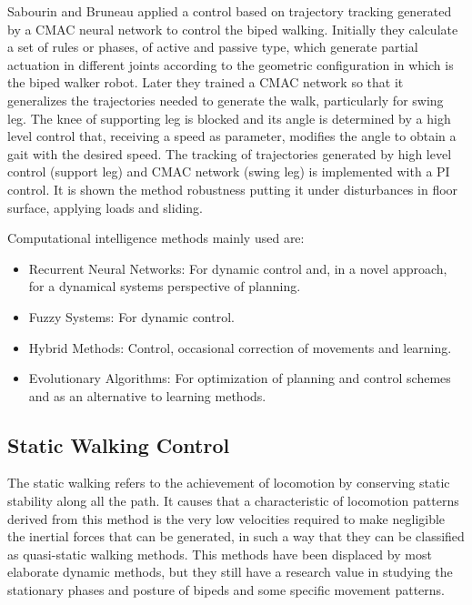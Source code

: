 Sabourin and Bruneau \cite{Sabourin05Robustness} applied a control
based on trajectory tracking generated by a CMAC neural network to
control the biped walking. Initially they calculate a set of rules or
phases, of active and passive type, which generate partial actuation
in different joints according to the geometric configuration in which
is the biped walker robot. Later they trained a CMAC network so that
it generalizes the trajectories needed to generate the walk,
particularly for swing leg. The knee of supporting leg is blocked and
its angle is determined by a high level control that, receiving a
speed as parameter, modifies the angle to obtain a gait with the
desired speed. The tracking of trajectories generated by high level
control (support leg) and CMAC network (swing leg) is implemented with
a PI control. It is shown the method robustness putting it under
disturbances in floor surface, applying loads and sliding.

Computational intelligence methods mainly used are:
\begin{itemize}
\item Recurrent Neural Networks: For dynamic control and, in a novel
  approach, for a dynamical systems perspective of planning.
\item Fuzzy Systems: For dynamic control.
\item Hybrid Methods: Control, occasional correction of movements and
  learning.
\item Evolutionary Algorithms: For optimization of planning and
  control schemes and as an alternative to learning methods.
\end{itemize}

\subsection{Static Walking Control}
The static walking refers to the achievement of locomotion by
conserving static stability along all the path. It causes that a
characteristic of locomotion patterns derived from this method is the
very low velocities required to make negligible the inertial forces
that can be generated, in such a way that they can be classified as
quasi-static walking methods. This methods have been displaced by most
elaborate dynamic methods, but they still have a research value in
studying the stationary phases and posture of bipeds and some specific
movement patterns.


